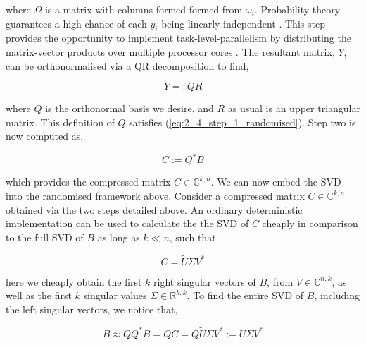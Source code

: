 where $\Omega$ is a matrix with columns formed formed from $\omega_i$.
Probability theory guarantees a high-chance of each $y_i$ being linearly independent
\cite{Erichson:2019:JOSS}. This step provides the opportunity to implement
\gls{task-level-parallelism} by distributing the matrix-vector products over multiple
processor cores \cite{Halko:2011:SIAM}. The resultant matrix, $Y$, can be
orthonormalised via a QR decomposition to find,

\begin{equation}
    Y =: QR
\end{equation}

where $Q$ is the orthonormal basis we desire, and $R$ as usual is an upper triangular
matrix. This definition of $Q$ satisfies (\ref{eq:2_4_step_1_randomised}). Step two
is now computed as,

\begin{equation}
    C := Q^* B
    \label{eq:2_4_step_2_randomised}
\end{equation}

which provides the compressed matrix $C \in \mathbb{C}^{k, n}$.
We can now embed the \gls{SVD} into the randomised framework above. Consider a compressed matrix
$C \in \mathbb{C}^{k, n}$ obtained via the two steps detailed above. An
ordinary deterministic implementation can be used to calculate the
the \gls{SVD} of $C$ cheaply in comparison to the full SVD of $B$ as long as
$k \ll n$, such that

\begin{equation}
    C = \tilde{U}\Sigma V^*
    \label{eq:2_4_svd_of_c}
\end{equation}

here we cheaply obtain the first $k$ right singular vectors of $B$,
from $V \in \mathbb{C}^{n, k}$, as well as the first $k$ singular values
$\Sigma \in \mathbb{R}^{k, k}$. To find the entire \gls{SVD} of $B$, including the
left singular vectors, we notice that,

\begin{equation}
    B \approx Q Q^* B = QC = Q \tilde{U} \Sigma V^* := U\Sigma V^*
\end{equation}

